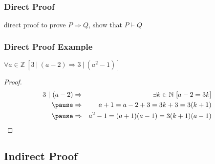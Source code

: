 \documentclass[dvipsnames]{beamer}
\begin{document}
%
%
%
%
%

\begin{frame}
  \frametitle{Direct Proof}

  \begin{block}{direct proof}
    to prove $P \Rightarrow Q$, show that $P \vdash Q$
  \end{block}
\end{frame}

\begin{frame}
  \frametitle{Direct Proof Example}

  \begin{theorem}
    $\forall a \in \mathbb{Z}~[3~|~(a-2) \Rightarrow 3~|~(a^2-1)]$
  \end{theorem}

  \pause
  \begin{proof}
    \begin{eqnarray*}
      3~|~(a-2) & \Rightarrow & \exists k \in \mathbb{N}~[a-2 = 3k]\\\pause
                & \Rightarrow & a+1 = a-2 + 3 = 3k+3 = 3(k+1)\\\pause
                & \Rightarrow & a^2-1 = (a+1)(a-1) = 3(k+1)(a-1)
    \end{eqnarray*}
  \end{proof}
\end{frame}

\subsection{Indirect Proof}
\end{document}
